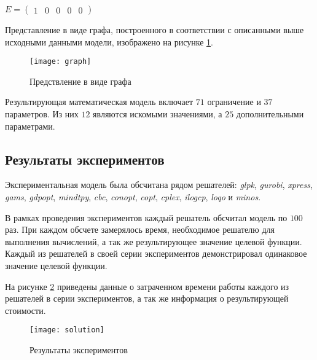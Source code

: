 \begin{center}
  $
  E = \begin{pmatrix}
    1 & 0 & 0 & 0 & 0
  \end{pmatrix}
  $
\end{center}


Представление в виде графа, построенного в соответствии с описанными выше исходными данными модели, изображено на рисунке \ref{fig:graph}.

\begin{figure}[H]
  \centering
  \texttt{[image: graph]}
  \caption{Предствление в виде графа}
  \label{fig:graph}
\end{figure}


Результирующая математическая модель включает $71$ ограничение и $37$ параметров. Из них $12$ являются искомыми значениями, а $25$ дополнительными параметрами.

\subsection*{Результаты экспериментов}
Экспериментальная модель была обсчитана рядом решателей: \textit{glpk}, \textit{gurobi}, \textit{xpress}, \textit{gams}, \textit{gdpopt}, \textit{mindtpy}, \textit{cbc}, \textit{conopt}, \textit{copt}, \textit{cplex}, \textit{ilogcp}, \textit{loqo} и \textit{minos}.

В рамках проведения экспериментов каждый решатель обсчитал модель по $100$ раз. При каждом обсчете замерялось время, необходимое решателю для выполнения вычислений, а так же результирующее значение целевой функции. Каждый из решателей в своей серии экспериментов демонстрировал одинаковое значение целевой функции.

На рисунке \ref{fig:solution} приведены данные о затраченном времени работы каждого из решателей в серии экспериментов, а так же информация о результирующей стоимости.

\begin{figure}[H]
  \centering
  \texttt{[image: solution]}
  \caption{Результаты экспериментов}
  \label{fig:solution}
\end{figure}

